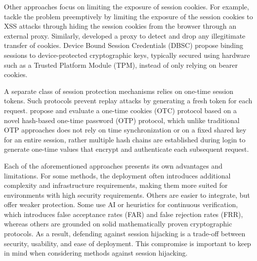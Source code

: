 Other approaches focus on limiting the exposure of session cookies. For example, \cite{10.1007/978-3-642-19125-1_7} tackle the problem preemptively by limiting the exposure of the session cookies to XSS attacks through hiding the session cookies from the browser through an external proxy. Similarly, \cite{10.1007/978-3-319-64701-2_7} developed a proxy to detect and drop any illegitimate transfer of cookies. Device Bound Session Credentials (DBSC) \cite{w3c-dbsc} propose binding sessions to device-protected cryptographic keys, typically secured using hardware such as a Trusted Platform Module (TPM), instead of only relying on bearer cookies. 

A separate class of session protection mechanisms relies on one-time session tokens. Such protocols prevent replay attacks by generating a fresh token for each request. \cite{He2020} propose and evaluate a one-time cookies (OTC) protocol based on a novel hash-based one-time password (OTP) protocol, which unlike traditional OTP approaches does not rely on time synchronization or on a fixed shared key for an entire session, rather multiple hash chains are established during login to generate one-time values that encrypt and authenticate each subsequent request.

Each of the aforementioned approaches presents its own advantages and limitations. For some methods, the deployment often introduces additional complexity and infrastructure requirements, making them more suited for environments with high security requirements. Others are easier to integrate, but offer weaker protection. Some use AI or heuristics for continuous verification, which introduces false acceptance rates (FAR) and false rejection rates (FRR), whereas others are grounded on solid mathematically proven cryptographic protocols. As a result, defending against session hijacking is a trade-off between security, usability, and ease of deployment. This compromise is important to keep in mind when considering methods against session hijacking.
